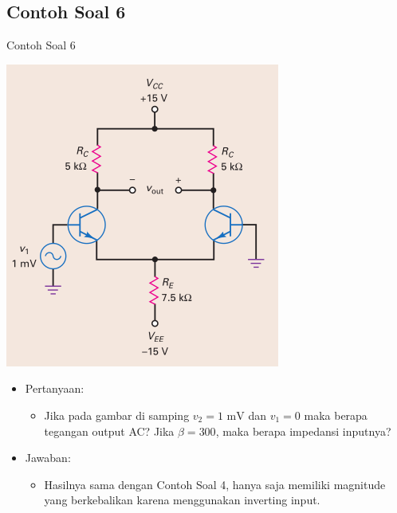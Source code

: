 \documentclass[aspectratio=169]{beamer}
\begin{document}
\subsection{Contoh Soal 6}
\begin{frame}{Contoh Soal 6}
	\begin{multicols}{2}
		\begin{center}
			\includegraphics[height=0.7\textheight]{gambar/01.diff-amp/01.contoh_soal_1-2}
		\end{center}
		\columnbreak
		\begin{itemize}
			\item Pertanyaan:
			\begin{itemize}
				\item Jika pada gambar di samping $ v_2 = 1 \text{ mV} $ dan $ v_1 = 0 $ maka berapa tegangan output AC? Jika $ \beta = 300 $, maka berapa impedansi inputnya?
			\end{itemize}
			\item Jawaban:
			\begin{itemize}
				\item Hasilnya sama dengan Contoh Soal 4, hanya saja memiliki magnitude yang berkebalikan karena menggunakan inverting input.
			\end{itemize}
		\end{itemize}
	\end{multicols}
\end{frame}
\end{document}
